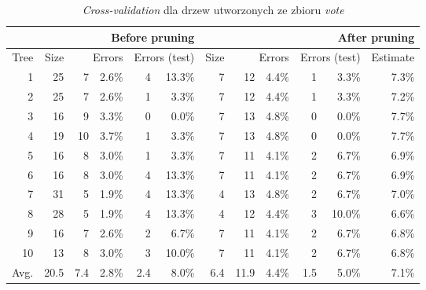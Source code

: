 \begin{table}
\begin{tabular}{|r||r|rr|rr||r|rr|rr|r|}
\hline
&\multicolumn{5}{1||}{Before pruning}&\multicolumn{6}{1|}{After pruning} \\
\hline
Tree & 
Size & 
\multicolumn{2}{1|}{Errors} & 
\multicolumn{2}{1||}{Errors (test)} & 
Size & 
\multicolumn{2}{1|}{Errors} & 
\multicolumn{2}{1|}{Errors (test)} & 
Estimate \\
\hline\hline
    1 &   25 &    7 & 2.6\% &    4 & 13.3\% &    7 &   12 & 4.4\% &    1 &  3.3\%  &   7.3\%  \\
    2 &   25 &    7 & 2.6\% &    1 &  3.3\% &    7 &   12 & 4.4\% &    1 &  3.3\%  &   7.2\%  \\
    3 &   16 &    9 & 3.3\% &    0 &  0.0\% &    7 &   13 & 4.8\% &    0 &  0.0\%  &   7.7\%  \\
    4 &   19 &   10 & 3.7\% &    1 &  3.3\% &    7 &   13 & 4.8\% &    0 &  0.0\%  &   7.7\%  \\
    5 &   16 &    8 & 3.0\% &    1 &  3.3\% &    7 &   11 & 4.1\% &    2 &  6.7\%  &   6.9\%  \\
    6 &   16 &    8 & 3.0\% &    4 & 13.3\% &    7 &   11 & 4.1\% &    2 &  6.7\%  &   6.9\%  \\
    7 &   31 &    5 & 1.9\% &    4 & 13.3\% &    4 &   13 & 4.8\% &    2 &  6.7\%  &   7.0\%  \\
    8 &   28 &    5 & 1.9\% &    4 & 13.3\% &    4 &   12 & 4.4\% &    3 & 10.0\%  &   6.6\%  \\
    9 &   16 &    7 & 2.6\% &    2 &  6.7\% &    7 &   11 & 4.1\% &    2 &  6.7\%  &   6.8\%  \\
   10 &   13 &    8 & 3.0\% &    3 & 10.0\% &    7 &   11 & 4.1\% &    2 &  6.7\%  &   6.8\%  \\
\hline\hline
 Avg. & 20.5 &  7.4 & 2.8\% &  2.4 & 8.0\%  &  6.4 & 11.9 & 4.4\% &  1.5 &  5.0\%  &   7.1\%  \\
\hline
\end{tabular}
\caption{\emph{Cross-validation} dla drzew utworzonych ze zbioru \emph{vote}}
\label{p2t2-vote-trees-cv}
\end{table}
